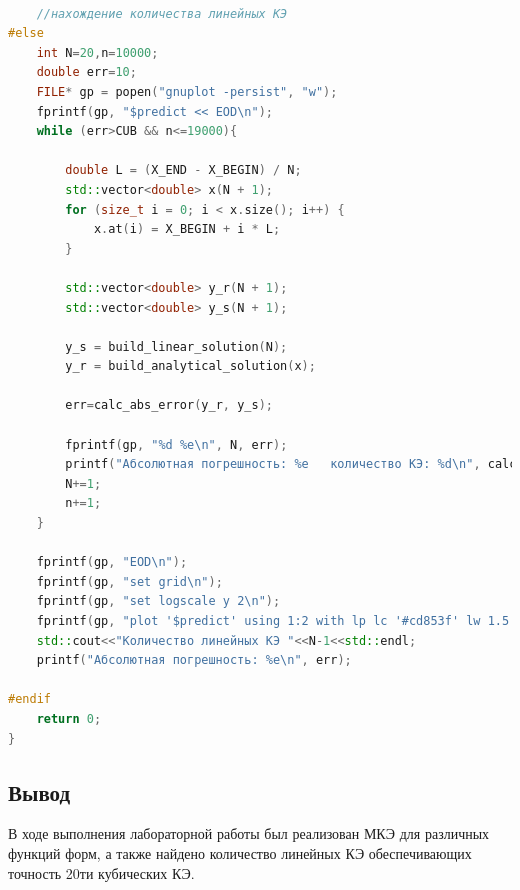 \begin{lstlisting}[language=c++, label=prog,caption={\textit{Реализация МКЭ}}]
     
    //нахождение количества линейных КЭ
#else
    int N=20,n=10000;
    double err=10;
    FILE* gp = popen("gnuplot -persist", "w");
    fprintf(gp, "$predict << EOD\n");
    while (err>CUB && n<=19000){
        
        double L = (X_END - X_BEGIN) / N;
        std::vector<double> x(N + 1);
        for (size_t i = 0; i < x.size(); i++) {
            x.at(i) = X_BEGIN + i * L;
        }
        
        std::vector<double> y_r(N + 1);
        std::vector<double> y_s(N + 1);
        
        y_s = build_linear_solution(N);
        y_r = build_analytical_solution(x);
        
        err=calc_abs_error(y_r, y_s);
        
        fprintf(gp, "%d %e\n", N, err);
        printf("Абсолютная погрешность: %e   количество КЭ: %d\n", calc_abs_error(y_r, y_s), N);
        N+=1;
        n+=1;
    }
    
    fprintf(gp, "EOD\n");
    fprintf(gp, "set grid\n");
    fprintf(gp, "set logscale y 2\n");
    fprintf(gp, "plot '$predict' using 1:2 with lp lc '#cd853f' lw 1.5 pt 7 ps 0.5 title 'Абсолютная погрешность',\n" );
    std::cout<<"Количество линейных КЭ "<<N-1<<std::endl;
    printf("Абсолютная погрешность: %e\n", err);

#endif 
    return 0;
}

\end{lstlisting}
\subsection{Вывод}

В ходе выполнения лабораторной работы был реализован МКЭ для различных функций форм, а также найдено количество линейных КЭ обеспечивающих точность 20ти кубических КЭ.




